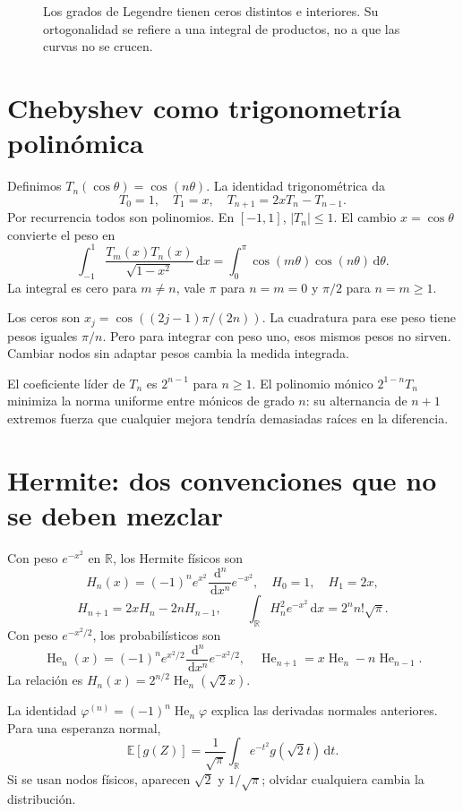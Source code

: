 \documentclass[11pt,a4paper]{article}
\newcommand{\R}{\mathbb R}
\newcommand{\E}{\mathbb E}
\newcommand{\dd}{\,\mathrm d}
\theoremstyle{definition}
\newcommand{\ph}{\varphi}
\begin{document}
\begin{figure}[htbp]
\caption{Los grados de Legendre tienen ceros distintos e interiores. Su ortogonalidad se refiere a una integral de productos, no a que las curvas no se crucen.}\label{fig:cdf-7}\end{figure}

\section{Chebyshev como trigonometría polinómica}
Definimos $T_n(\cos\theta)=\cos(n\theta)$. La identidad trigonométrica da
\[
T_0=1,\quad T_1=x,\quad T_{n+1}=2xT_n-T_{n-1}.
\]
Por recurrencia todos son polinomios. En $[-1,1]$, $|T_n|\le1$. El cambio $x=\cos\theta$ convierte el peso en
\[
\int_{-1}^1\frac{T_m(x)T_n(x)}{\sqrt{1-x^2}}\dd x
=\int_0^\pi\cos(m\theta)\cos(n\theta)\dd\theta.
\]
La integral es cero para $m\ne n$, vale $\pi$ para $n=m=0$ y $\pi/2$ para $n=m\ge1$.

Los ceros son $x_j=\cos((2j-1)\pi/(2n))$. La cuadratura para ese peso tiene pesos iguales $\pi/n$. Pero para integrar con peso uno, esos mismos pesos no sirven. Cambiar nodos sin adaptar pesos cambia la medida integrada.

El coeficiente líder de $T_n$ es $2^{n-1}$ para $n\ge1$. El polinomio mónico $2^{1-n}T_n$ minimiza la norma uniforme entre mónicos de grado $n$: su alternancia de $n+1$ extremos fuerza que cualquier mejora tendría demasiadas raíces en la diferencia.

\section{Hermite: dos convenciones que no se deben mezclar}
Con peso $e^{-x^2}$ en $\R$, los Hermite físicos son
\[
H_n(x)=(-1)^ne^{x^2}\frac{\dd^n}{\dd x^n}e^{-x^2},
\quad H_0=1,\quad H_1=2x,
\]
\[
H_{n+1}=2xH_n-2nH_{n-1},\qquad
\int_\R H_n^2e^{-x^2}\dd x=2^nn!\sqrt\pi.
\]
Con peso $e^{-x^2/2}$, los probabilísticos son
\[
\operatorname{He}_n(x)=(-1)^ne^{x^2/2}\frac{\dd^n}{\dd x^n}e^{-x^2/2},
\quad \operatorname{He}_{n+1}=x\operatorname{He}_n-n\operatorname{He}_{n-1}.
\]
La relación es $H_n(x)=2^{n/2}\operatorname{He}_n(\sqrt2x)$.

La identidad $\ph^{(n)}=(-1)^n\operatorname{He}_n\ph$ explica las derivadas normales anteriores. Para una esperanza normal,
\[
\E[g(Z)]=\frac1{\sqrt\pi}\int_\R e^{-t^2}g(\sqrt2t)\dd t.
\]
Si se usan nodos físicos, aparecen $\sqrt2$ y $1/\sqrt\pi$; olvidar cualquiera cambia la distribución.
\end{document}
